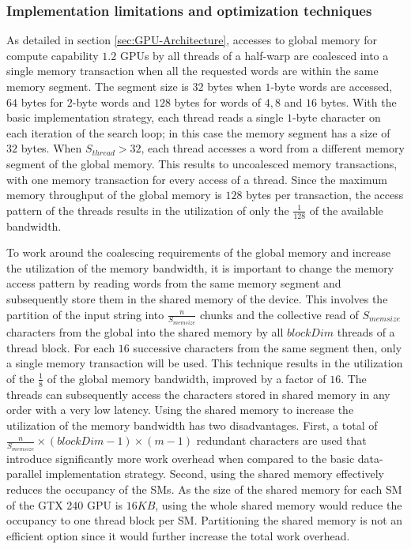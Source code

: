 \documentclass{ws-ijait}
\begin{document}
\subsubsection{Implementation limitations and optimization techniques}
\label{subsec:implementation-limitations-optimizations}

As detailed in section \ref{sec:GPU-Architecture}, accesses to global memory for compute capability $1.2$ GPUs by all threads of a half-warp are coalesced into a single memory transaction when all the requested words are within the same memory segment. The segment size is $32$ bytes when $1$-byte words are accessed, $64$ bytes for $2$-byte words and $128$ bytes for words of $4, 8$ and $16$ bytes. With the basic implementation strategy, each thread reads a single $1$-byte character on each iteration of the search loop; in this case the memory segment has a size of $32$ bytes. When $S_{thread} > 32$, each thread accesses a word from a different memory segment of the global memory. This results to uncoalesced memory transactions, with one memory transaction for every access of a thread. Since the maximum memory throughput of the global memory is $128$ bytes per transaction, the access pattern of the threads results in the utilization of only the $\frac{1}{128}$ of the available bandwidth.

To work around the coalescing requirements of the global memory and increase the utilization of the memory bandwidth, it is important to change the memory access pattern by reading words from the same memory segment and subsequently store them in the shared memory of the device. This involves the partition of the input string into $\frac{n}{S_{memsize}}$ chunks and the collective read of $S_{memsize}$ characters from the global into the shared memory by all $blockDim$ threads of a thread block. For each $16$ successive characters from the same segment then, only a single memory transaction will be used. This technique results in the utilization of the $\frac{1}{8}$ of the global memory bandwidth, improved by a factor of $16$. The threads can subsequently access the characters stored in shared memory in any order with a very low latency. Using the shared memory to increase the utilization of the memory bandwidth has two disadvantages. First, a total of $\frac{n}{S_{memsize}} \times ( blockDim - 1 ) \times ( m - 1 )$ redundant characters are used that introduce significantly more work overhead when compared to the basic data-parallel implementation strategy. Second, using the shared memory effectively reduces the occupancy of the SMs. As the size of the shared memory for each SM of the GTX 240 GPU is $16KB$, using the whole shared memory would reduce the occupancy to one thread block per SM. Partitioning the shared memory is not an efficient option since it would further increase the total work overhead.
\end{document}
